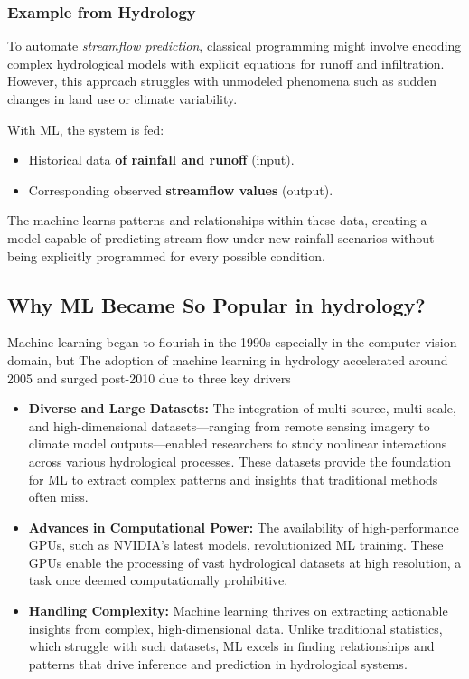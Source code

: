 \subsubsection{Example from Hydrology}

To automate \textit{streamflow prediction}, classical programming might involve encoding complex hydrological models with explicit equations for runoff and infiltration. However, this approach struggles with unmodeled phenomena such as sudden changes in land use or climate variability.

With ML, the system is fed:
\begin{itemize}
    \item Historical data \textbf{ of rainfall and runoff} (input).
    \item Corresponding observed \textbf{streamflow values} (output).
\end{itemize}

The machine learns patterns and relationships within these data, creating a model capable of predicting stream flow under new rainfall scenarios without being explicitly programmed for every possible condition.

\subsection{Why ML Became So Popular in hydrology?}

Machine learning began to flourish in the 1990s especially in the computer vision domain, but The adoption of machine learning in hydrology accelerated around 2005 and surged post-2010 due to three key drivers
\begin{itemize}
    \item \textbf{Diverse and Large Datasets:}  The integration of multi-source, multi-scale, and high-dimensional datasets—ranging from remote sensing imagery to climate model outputs—enabled researchers to study nonlinear interactions across various hydrological processes. These datasets provide the foundation for ML to extract complex patterns and insights that traditional methods often miss.
    \item \textbf{Advances in Computational Power:}  The availability of high-performance GPUs, such as NVIDIA's latest models, revolutionized ML training. These GPUs enable the processing of vast hydrological datasets at high resolution, a task once deemed computationally prohibitive.
    \item \textbf{Handling Complexity: } Machine learning thrives on extracting actionable insights from complex, high-dimensional data. Unlike traditional statistics, which struggle with such datasets, ML excels in finding relationships and patterns that drive inference and prediction in hydrological systems.
    
\end{itemize}

